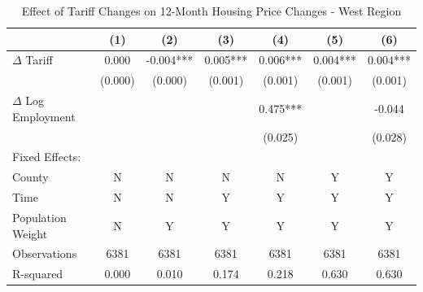 \begin{table}[htbp]
\centering
\caption{Effect of Tariff Changes on 12-Month Housing Price Changes - West Region}
\label{tab:tariffs_changes_west}
\begin{tabular}{lcccccc}
\toprule
{} &       (1) &      (2) &       (3) &       (4) &       (5) &        (6) \\
\midrule
$\Delta$ Tariff  &   0.000 &    -0.004*** &    0.005*** &    0.006*** &    0.004*** &    0.004*** \\
                 &    (0.000) &   (0.000) &   (0.001) &   (0.001) &   (0.001) &   (0.001) \\
$\Delta$ Log Employment  &           &           &           &  0.475*** &           &  -0.044 \\
                  &           &           &           &   (0.025) &           &   (0.028) \\
Fixed Effects:    &           &           &           &           &           &           \\
County           &         N &        N &        N &        N &        Y &        Y \\
Time             &        N &         N &         Y &         Y &         Y &         Y \\
Population Weight &        N &         Y &         Y &         Y &         Y &         Y \\
\midrule
Observations     &     6381 &     6381 &     6381 &     6381 &     6381 &     6381 \\
R-squared        &     0.000 &     0.010 &     0.174 &     0.218 &     0.630 &     0.630 \\
\bottomrule
\end{tabular}
\end{table}
\FloatBarrier